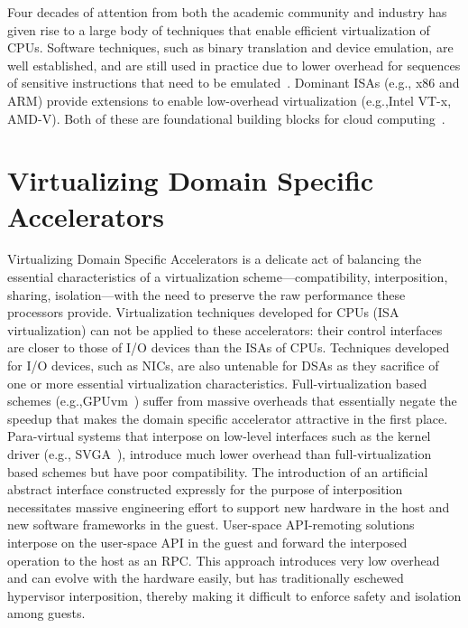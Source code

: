 Four decades of attention from both the academic community and industry has
given rise to a large body of techniques that enable efficient virtualization
of CPUs. Software techniques, such as binary translation and device emulation,
are well established, and are still used in practice due to lower overhead for
sequences of sensitive instructions that need to be emulated~\cite{
vmware-esx-bt-plus-vtx}. Dominant ISAs (e.g., x86 and ARM) provide extensions
to enable low-overhead virtualization (e.g.,Intel VT-x, AMD-V). Both of these
are foundational building blocks for cloud computing~\cite{amazon_ec2}.

\section{Virtualizing Domain Specific Accelerators}
Virtualizing Domain Specific Accelerators is a delicate act of balancing the
essential characteristics of a virtualization scheme---compatibility,
interposition, sharing, isolation---with the need to preserve the raw
performance these processors provide.
Virtualization techniques developed for CPUs (ISA virtualization) can not be
applied to these accelerators: their control interfaces are closer to those of
I/O devices than the ISAs of CPUs. Techniques developed for I/O devices, such
as NICs, are also untenable for DSAs as they sacrifice of one or more
essential virtualization characteristics.
Full-virtualization based schemes (e.g.,GPUvm~\cite{suzuki2014gpuvm}) suffer
from massive overheads that essentially negate the speedup that makes the
domain specific accelerator attractive in the first place.
Para-virtual systems that interpose on low-level interfaces such as the kernel
driver (e.g., SVGA~\cite{dowty2009gpu}), introduce much lower overhead than
full-virtualization based schemes but have poor compatibility. The
introduction of an artificial abstract interface constructed expressly for the
purpose of interposition necessitates massive engineering effort to support
new hardware in the host and new software frameworks in the guest.
User-space API-remoting solutions~\cite{vmCUDA,rCUDA,rCUDAnew} interpose on
the user-space API in the guest and forward the interposed operation to the
host as an RPC. This approach introduces very low overhead and can evolve with
the hardware easily, but has traditionally eschewed hypervisor interposition,
thereby making it difficult to enforce safety and isolation among guests.

